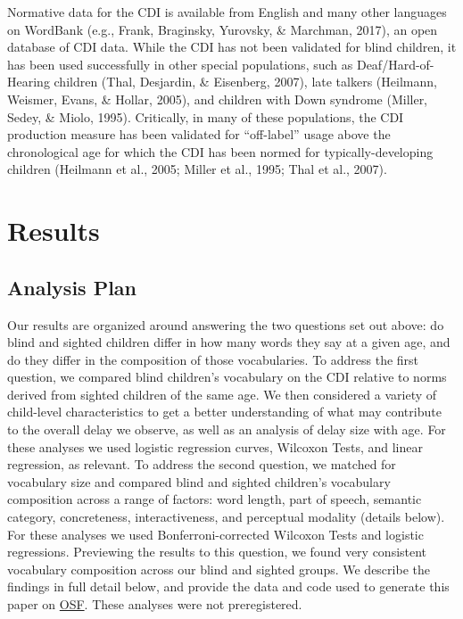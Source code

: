 \documentclass[
  man,floatsintext]{apa6}
\begin{document}
Normative data for the CDI is available from English and many other languages on WordBank (e.g., Frank, Braginsky, Yurovsky, \& Marchman, 2017), an open database of CDI data. While the CDI has not been validated for blind children, it has been used successfully in other special populations, such as Deaf/Hard-of-Hearing children (Thal, Desjardin, \& Eisenberg, 2007), late talkers (Heilmann, Weismer, Evans, \& Hollar, 2005), and children with Down syndrome (Miller, Sedey, \& Miolo, 1995). Critically, in many of these populations, the CDI production measure has been validated for ``off-label'' usage above the chronological age for which the CDI has been normed for typically-developing children (Heilmann et al., 2005; Miller et al., 1995; Thal et al., 2007).

\hypertarget{results}{%
\section{Results}\label{results}}

\hypertarget{analysis-plan}{%
\subsection{Analysis Plan}\label{analysis-plan}}

Our results are organized around answering the two questions set out above: do blind and sighted children differ in how many words they say at a given age, and do they differ in the composition of those vocabularies. To address the first question, we compared blind children's vocabulary on the CDI relative to norms derived from sighted children of the same age. We then considered a variety of child-level characteristics to get a better understanding of what may contribute to the overall delay we observe, as well as an analysis of delay size with age. For these analyses we used logistic regression curves, Wilcoxon Tests, and linear regression, as relevant. To address the second question, we matched for vocabulary size and compared blind and sighted children's vocabulary composition across a range of factors: word length, part of speech, semantic category, concreteness, interactiveness, and perceptual modality (details below). For these analyses we used Bonferroni-corrected Wilcoxon Tests and logistic regressions. Previewing the results to this question, we found very consistent vocabulary composition across our blind and sighted groups. We describe the findings in full detail below, and provide the data and code used to generate this paper on \href{https://osf.io/uw6zm/?view_only=fdee466143f64d678d7f9d87b23ec566}{OSF}. These analyses were not preregistered.
\end{document}
